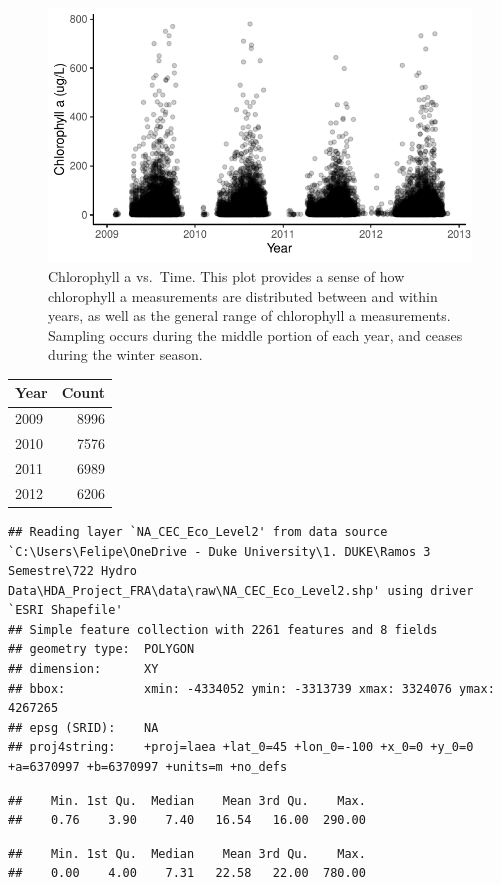 \documentclass[12pt,]{article}
\begin{document}
\begin{figure}
\centering
\includegraphics{Bollt_Greif_Raby_Roth_Draft_1115_files/figure-latex/unnamed-chunk-3-1.pdf}
\caption{Chlorophyll a vs.~Time. This plot provides a sense of how
chlorophyll a measurements are distributed between and within years, as
well as the general range of chlorophyll a measurements. Sampling occurs
during the middle portion of each year, and ceases during the winter
season.}
\end{figure}

\begin{longtable}[]{@{}lr@{}}
\toprule
Year & Count\tabularnewline
\midrule
\endhead
2009 & 8996\tabularnewline
2010 & 7576\tabularnewline
2011 & 6989\tabularnewline
2012 & 6206\tabularnewline
\bottomrule
\end{longtable}

\begin{verbatim}
## Reading layer `NA_CEC_Eco_Level2' from data source `C:\Users\Felipe\OneDrive - Duke University\1. DUKE\Ramos 3 Semestre\722 Hydro Data\HDA_Project_FRA\data\raw\NA_CEC_Eco_Level2.shp' using driver `ESRI Shapefile'
## Simple feature collection with 2261 features and 8 fields
## geometry type:  POLYGON
## dimension:      XY
## bbox:           xmin: -4334052 ymin: -3313739 xmax: 3324076 ymax: 4267265
## epsg (SRID):    NA
## proj4string:    +proj=laea +lat_0=45 +lon_0=-100 +x_0=0 +y_0=0 +a=6370997 +b=6370997 +units=m +no_defs
\end{verbatim}

\begin{verbatim}
##    Min. 1st Qu.  Median    Mean 3rd Qu.    Max. 
##    0.76    3.90    7.40   16.54   16.00  290.00
\end{verbatim}

\begin{verbatim}
##    Min. 1st Qu.  Median    Mean 3rd Qu.    Max. 
##    0.00    4.00    7.31   22.58   22.00  780.00
\end{verbatim}
\end{document}
